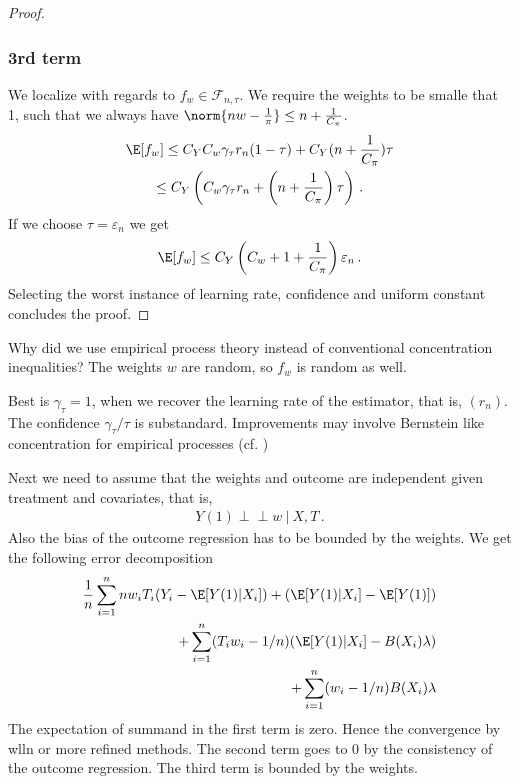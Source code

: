 \begin{proof}
\subsubsection*{3rd term}
We localize with regards to 
$
f_w \in \mathcal{F}_{n,\tau}
.
$
We require the weights to be smalle that 1, such that 
we always have
$
\norm{nw-  \frac{1}{\pi}}
\le
n + \frac{1}{C_\pi}
$.
\begin{gather}
  \E[f_w]
  \le
  C_Y 
  C_w
  \gamma_\tau
  r_n
  (1-\tau)
  +
  C_Y
  (
n + \frac{1}{C_\pi}
  )
  \tau
  \\
  \le
  C_Y
  \left( 
  C_w
  \gamma_\tau
  r_n
  +
  \left(
n + \frac{1}{C_\pi}
  \right)
  \tau
  \right)
  \,.
\end{gather}
If we choose  $\tau=\varepsilon_n$
we get
\begin{gather}
  \E[f_w]
  \le
  C_Y
  \left( 
C_w+1+ \frac{1}{C_\pi}
  \right)
  \varepsilon_n
  \,.
\end{gather}
Selecting the worst instance of learning rate, confidence and uniform constant concludes the proof.

\end{proof}

\begin{reflection*}
  Why did we use empirical process theory instead of conventional concentration inequalities?
  The weights $w$ are random, so $f_w$ is random as well. 

Best is $\gamma_\tau=1$, when we recover the learning rate of the estimator, that is, $(r_n)$.
The confidence $\gamma_\tau/\tau$ is substandard. Improvements may involve Bernstein like concentration for empirical processes (cf. \cite[Section~2.14.2]{vaart2013})
\end{reflection*}

Next we need to assume that the weights and outcome are independent given treatment and covariates, that is,
\begin{gather}
  Y\!(1)\perp\!\!\!\perp w\ |\ X,T 
  \,.
\end{gather}
Also the bias of the outcome regression has to be bounded by the weights. We get the following error decomposition
\begin{align}
  \frac{1}{n}
  \sum_{i=1}^{n}
  nw_i T_i (Y_i - \E[Y(1)|X_i])
  +
  (\E[Y(1)|X_i]-\E[Y(1)])
  \\
  +
  \sum_{i=1}^{n} 
  (T_i w_i-1/n)
  (
  \E[Y(1)|X_i]
  -
  B(X_i)\lambda
  )
  \\
  +
  \sum_{i=1}^{n} 
  (w_i-1/n)
  B(X_i)\lambda
\end{align}
The expectation of summand in the first term is zero. Hence the convergence by wlln or more refined methods.
The second term goes to 0 by the consistency of the outcome regression.
The third term is bounded by the weights.

